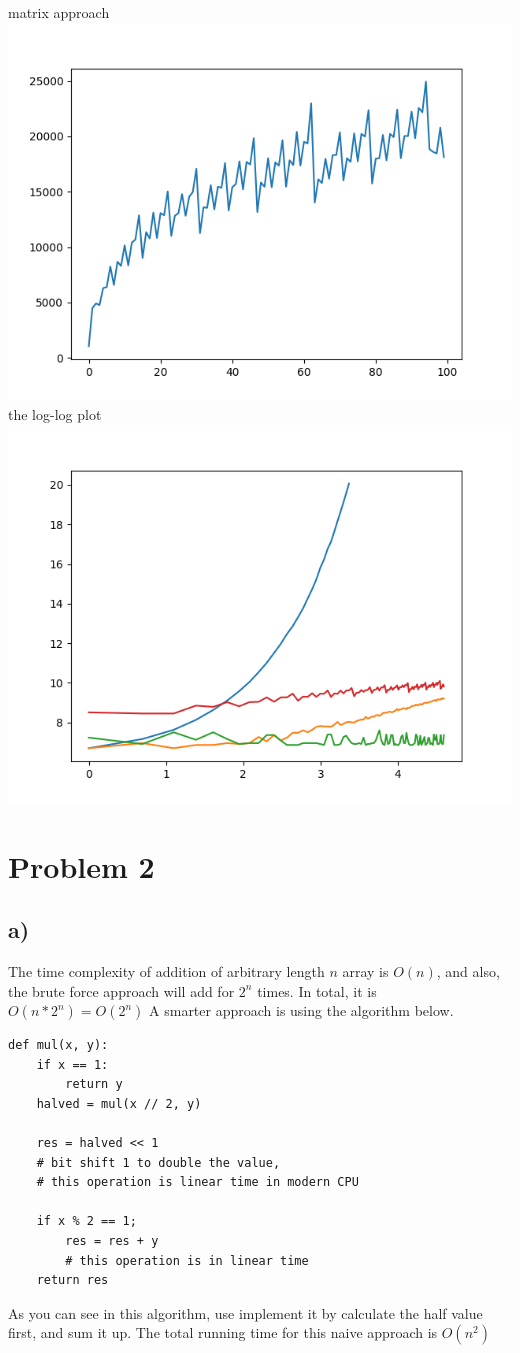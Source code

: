 \documentclass{article}
\begin{document}
matrix approach \\
\includegraphics{matrix.png}
the log-log plot \\
\includegraphics{loglog.png}
\section*{Problem 2}
\subsection*{a)}
The time complexity of addition of arbitrary length $n$ array
is $O(n)$, and also, the brute force approach will add for $2^n$ times.
In total, it is $O(n * 2^n) = O(2^n)$
A smarter approach is using the algorithm below.
\begin{verbatim}
def mul(x, y):
    if x == 1:
        return y
    halved = mul(x // 2, y)

    res = halved << 1
    # bit shift 1 to double the value,
    # this operation is linear time in modern CPU

    if x % 2 == 1;
        res = res + y
        # this operation is in linear time
    return res
\end{verbatim}
As you can see in this algorithm, use implement it by
calculate the half value first, and sum it up. The total
running time for this naive approach is $O(n^2)$
\end{document}
